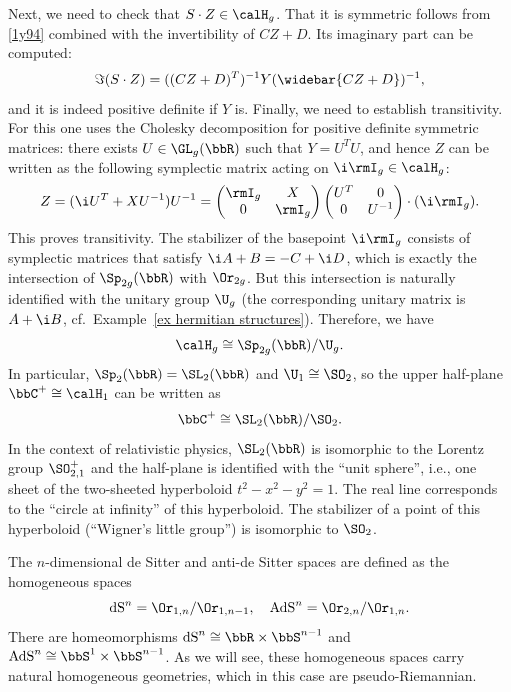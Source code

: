 \begin{example}
    Next, we need to check that $S\cdot Z\in \calH_g$. That it is symmetric follows from \eqref{1y94} combined with the invertibility of $CZ+D$. Its imaginary part can be computed:
    \[\Im (S\cdot Z)=((CZ+D)^T)^{-1}Y(\widebar{CZ+D})^{-1},\]
    and it is indeed positive definite if $Y$ is. Finally, we need to establish transitivity. For this one uses the Cholesky decomposition for positive definite symmetric matrices: there exists $U\in\GL_g(\bbR)$ such that $Y=U^TU$, and hence $Z$ can be written as the following symplectic matrix acting on $\i \rmI_g\in \calH_g$:
    \[Z=(\i U^T+XU^{-1})U^{-1}=\begin{pmatrix}
        \rmI_g & X\\
        0 & \rmI_g
    \end{pmatrix}\begin{pmatrix}
        U^T & 0\\
        0 & U^{-1}
    \end{pmatrix}\cdot(\i \rmI_g).\]
    This proves transitivity. The stabilizer of the basepoint $\i \rmI_g$ consists of symplectic matrices that satisfy $\i A+B=-C+\i D$, which is exactly the intersection of $\Sp_{2g}(\bbR)$ with $\Or_{2g}$. But this intersection is naturally identified with the unitary group $\U_g$ (the corresponding unitary matrix is $A+\i B$, cf.\ Example~\ref{ex hermitian structures}). Therefore, we have 
    \[\calH_g \cong \Sp_{2g}(\bbR)\slash \U_g.\]
    In particular, $\Sp_2(\bbR)=\SL_2(\bbR)$ and $\U_1\cong\SO_2$, so the upper half-plane $\bbC^+\cong \calH_1$ can be written as 
    \[\bbC^+\cong\SL_2(\bbR)\slash \SO_2.\]
    In the context of relativistic physics, $\SL_2(\bbR)$ is isomorphic to the Lorentz group $\SO^+_{2,1}$ and the half-plane is identified with the ``unit sphere'', i.e., one sheet of the two-sheeted hyperboloid $t^2-x^2-y^2=1$. The real line corresponds to the ``circle at infinity'' of this hyperboloid. The stabilizer of a point of this hyperboloid (``Wigner's little group'') is isomorphic to $\SO_2$.
\end{example}

\begin{example}\label{ex dS and AdS}
    The $n$-dimensional de Sitter and anti-de Sitter spaces are defined as the homogeneous spaces 
    \[\mathrm{dS}^n=\Or_{1,n}\slash \Or_{1,n-1},\quad \mathrm{AdS}^n=\Or_{2,n}\slash \Or_{1,n}.\]
    There are homeomorphisms $\mathrm{dS}^n\cong \bbR\times\bbS^{n-1}$ and $\mathrm{AdS}^n\cong \bbS^1\times\bbS^{n-1}$. As we will see, these homogeneous spaces carry natural homogeneous geometries, which in this case are pseudo-Riemannian.
\end{example}


